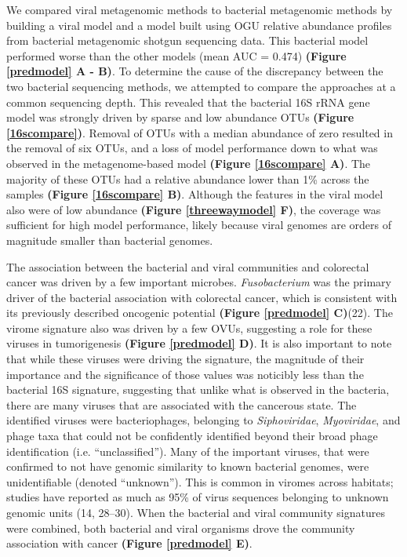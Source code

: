 \documentclass[12pt,]{article}
\begin{document}
We compared viral metagenomic methods to bacterial metagenomic methods
by building a viral model and a model built using OGU relative abundance
profiles from bacterial metagenomic shotgun sequencing data. This
bacterial model performed worse than the other models (mean AUC = 0.474)
\textbf{(Figure \ref{predmodel} A - B)}. To determine the cause of the
discrepancy between the two bacterial sequencing methods, we attempted
to compare the approaches at a common sequencing depth. This revealed
that the bacterial 16S rRNA gene model was strongly driven by sparse and
low abundance OTUs \textbf{(Figure \ref{16scompare})}. Removal of OTUs
with a median abundance of zero resulted in the removal of six OTUs, and
a loss of model performance down to what was observed in the
metagenome-based model \textbf{(Figure \ref{16scompare} A)}. The
majority of these OTUs had a relative abundance lower than 1\% across
the samples \textbf{(Figure \ref{16scompare} B)}. Although the features
in the viral model also were of low abundance \textbf{(Figure
\ref{threewaymodel} F)}, the coverage was sufficient for high model
performance, likely because viral genomes are orders of magnitude
smaller than bacterial genomes.

The association between the bacterial and viral communities and
colorectal cancer was driven by a few important microbes.
\emph{Fusobacterium} was the primary driver of the bacterial association
with colorectal cancer, which is consistent with its previously
described oncogenic potential \textbf{(Figure \ref{predmodel} C)}(22).
The virome signature also was driven by a few OVUs, suggesting a role
for these viruses in tumorigenesis \textbf{(Figure \ref{predmodel} D)}.
It is also important to note that while these viruses were driving the
signature, the magnitude of their importance and the significance of
those values was noticibly less than the bacterial 16S signature,
suggesting that unlike what is observed in the bacteria, there are many
viruses that are associated with the cancerous state. The identified
viruses were bacteriophages, belonging to \emph{Siphoviridae},
\emph{Myoviridae}, and phage taxa that could not be confidently
identified beyond their broad phage identification (i.e.
``unclassified''). Many of the important viruses, that were confirmed to
not have genomic similarity to known bacterial genomes, were
unidentifiable (denoted ``unknown''). This is common in viromes across
habitats; studies have reported as much as 95\% of virus sequences
belonging to unknown genomic units (14, 28--30). When the bacterial and
viral community signatures were combined, both bacterial and viral
organisms drove the community association with cancer \textbf{(Figure
\ref{predmodel} E)}.
\end{document}
